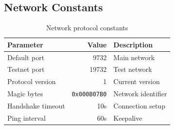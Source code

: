 \subsection{Network Constants}

\begin{table}[h]
\centering
\caption{Network protocol constants}
\label{tab:network-constants}
\begin{tabular}{@{}lrl@{}}
\toprule
\textbf{Parameter} & \textbf{Value} & \textbf{Description} \\
\midrule
Default port & 9732 & Main network \\
Testnet port & 19732 & Test network \\
Protocol version & 1 & Current version \\
Magic bytes & \texttt{0x000B07B0} & Network identifier \\
Handshake timeout & 10s & Connection setup \\
Ping interval & 60s & Keepalive \\
\bottomrule
\end{tabular}
\end{table}

